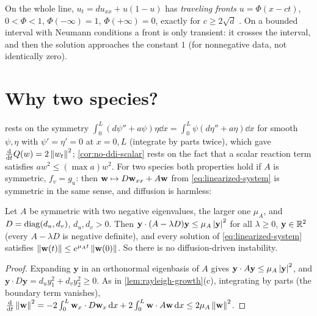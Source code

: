 \begin{remark}\label{rem:travelling-waves}
On the whole line, $u_t=du_{xx}+u(1-u)$ has \emph{traveling fronts}
$u=\Phi(x-ct)$, $0<\Phi<1$, $\Phi(-\infty)=1$, $\Phi(+\infty)=0$, exactly for
$c\ge2\sqrt d$ \cite{Murray2002}. On a bounded interval with Neumann conditions a
front is only transient: it crosses the interval, and then the solution approaches
the constant $1$ (for nonnegative data, not identically zero).
\end{remark}

\section{Why two species?}\label{sec:one-why-two}

 rests on the symmetry
$\int_0^L(d\psi''+a\psi)\eta\dd x=\int_0^L\psi(d\eta''+a\eta)\dd x$ for smooth
$\psi,\eta$ with $\psi'=\eta'=0$ at $x=0,L$ (integrate by parts twice), which gave
$\frac{\mathrm d}{\mathrm dt}Q(w)=2\left\lVert w_t\right\rVert^2$; \cref{cor:no-ddi-scalar} rests on the
fact that a scalar reaction term satisfies $aw^2\le(\max a)w^2$. For two species both
properties hold if $A$ is symmetric, $f_v=g_u$: then $\mathbf{w}\mapsto D\mathbf{w}_{xx}+A\mathbf{w}$ from
\eqref{eq:linearized-system} is symmetric in the same sense, and diffusion is harmless:

\begin{proposition}\label{prop:symmetric-no-ddi}
Let $A$ be symmetric with two negative eigenvalues, the larger one $\mu_A$, and
$D=\operatorname{diag}(d_u,d_v)$, $d_u,d_v>0$. Then $\mathbf y\cdot(A-\lambda D)\mathbf y\le
\mu_A\left\lvert \mathbf y\right\rvert^2$ for all $\lambda\ge0$, $\mathbf y\in\mathbb{R}^2$ (every $A-\lambda D$
is negative definite), and every solution of \eqref{eq:linearized-system} satisfies
$\left\lVert \mathbf{w}(t)\right\rVert\le e^{\mu_At}\left\lVert \mathbf{w}(0)\right\rVert$. So there is no diffusion-driven instability.
\end{proposition}

\begin{proof}
Expanding $\mathbf y$ in an orthonormal eigenbasis of $A$ gives
$\mathbf y\cdot A\mathbf y\le\mu_A\left\lvert \mathbf y\right\rvert^2$, and
$\mathbf y\cdot D\mathbf y=d_uy_1^2+d_vy_2^2\ge0$. As in \cref{lem:rayleigh-growth}(c),
integrating by parts (the boundary term vanishes),
$\frac{\mathrm d}{\mathrm dt}\left\lVert \mathbf{w}\right\rVert^2=-2\int_0^L\mathbf{w}_x\cdot D\mathbf{w}_x\,\mathrm{d} x
+2\int_0^L\mathbf{w}\cdot A\mathbf{w}\,\mathrm{d} x\le2\mu_A\left\lVert \mathbf{w}\right\rVert^2$.
\end{proof}

